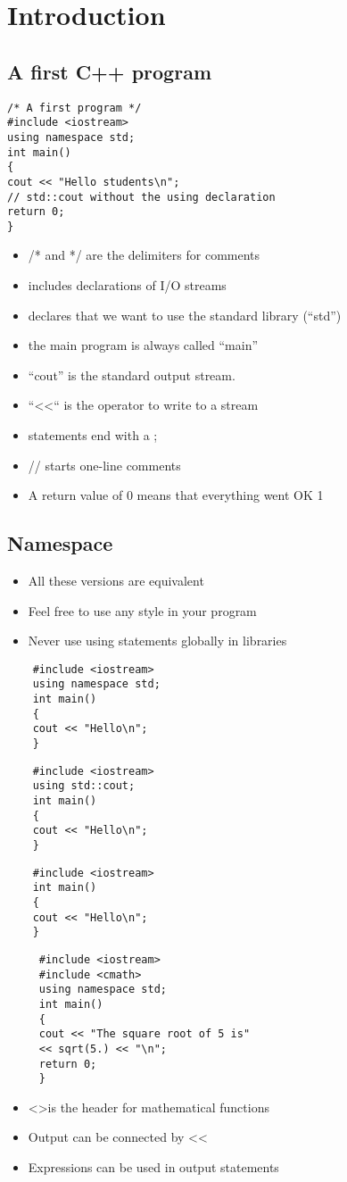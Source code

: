 \chapter{Introduction}
\section{A first C++ program}
\begin{lstlisting}
/* A first program */
#include <iostream>
using namespace std;
int main()
{
cout << "Hello students\n";
// std::cout without the using declaration 
return 0;
}
\end{lstlisting}
\begin{itemize}
	\item /* and */ are the delimiters for
	comments
	\item includes declarations of I/O
	streams
	\item declares that we want to use the
	standard library (“std”)
	\item the main program is always
	called “main”
	\item “cout” is the standard output
	stream.
	\item “<<“ is the operator to write to a
	stream
	\item statements end with a ;
	\item // starts one-line comments
	\item A return value of 0 means that
	everything went OK
	1
\end{itemize}
\section{Namespace}
\begin{itemize}
	\item  All these versions are equivalent
	\item  Feel free to use any style in your
	program
	\item  Never use using statements
globally in libraries
\end{itemize}
\begin{lstlisting}
	#include <iostream>
	using namespace std;
	int main()
	{
	cout << "Hello\n";
	}
\end{lstlisting}
\begin{lstlisting}
	#include <iostream>
	using std::cout;
	int main()
	{
	cout << "Hello\n";
	}
\end{lstlisting}
\begin{lstlisting}
	#include <iostream>
	int main()
	{
	cout << "Hello\n";
	}
\end{lstlisting}
\begin{lstlisting}
	 #include <iostream>
	 #include <cmath>
	 using namespace std;
	 int main()
	 {
	 cout << "The square root of 5 is"
	 << sqrt(5.) << "\n";
	 return 0;
	 }
\end{lstlisting}
\begin{itemize}
	\item \textless {}\textgreater is the header for
 mathematical functions
 \item Output can be connected by \textless\textless
 \item Expressions can be used in
 output statements
\end{itemize}
